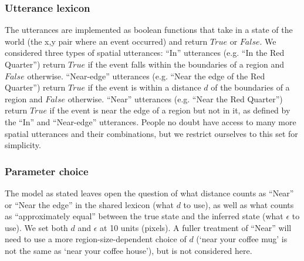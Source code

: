 \documentclass[10pt,letterpaper]{article}
\begin{document}
\subsubsection{Utterance lexicon} The utterances are implemented as boolean functions that take in a state of the world (the x,y pair where an event occurred) and return $True$ or $False$. We considered three types of spatial utterances: ``In'' utterances (e.g. ``In the Red Quarter'') return $True$ if the event falls within the boundaries of a region and $False$ otherwise. ``Near-edge'' utterances (e.g. ``Near the edge of the Red Quarter'') return $True$ if the event is within a distance $d$ of the boundaries of a region and $False$ otherwise. ``Near'' utterances (e.g. ``Near the Red Quarter'') return $True$ if the event is near the edge of a region but not in it, as defined by the ``In'' and ``Near-edge'' utterances. People no doubt have access to many more spatial utterances and their combinations, but we restrict ourselves to this set for simplicity. 

\subsubsection{Parameter choice} The model as stated leaves open the question of what distance counts as ``Near'' or ``Near the edge'' in the shared lexicon (what $d$ to use), as well as what counts as ``approximately equal'' between the true state and the inferred state (what $\epsilon$ to use). We set both $d$ and $\epsilon$ at 10 units (pixels). A fuller treatment of ``Near'' will need to use a more region-size-dependent choice of $d$ (`near your coffee mug' is not the same as `near your coffee house'), but is not considered here. 
\end{document}
